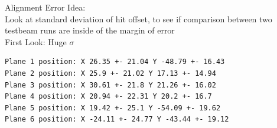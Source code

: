 \documentclass{beamer}
\begin{document}
\begin{frame}[fragile]{Alignment Error}
    \LARGE Idea: \normalsize \\
    Look at standard deviation of hit offset, to see if comparison between two
    testbeam runs are inside of the margin of error \\[.3cm]
    \LARGE First Look: \normalsize Huge \( \sigma \) \\
    \begin{lstlisting}
Plane 1 position: X 26.35 +- 21.04 Y -48.79 +- 16.43
Plane 2 position: X 25.9 +- 21.02 Y 17.13 +- 14.94
Plane 3 position: X 30.61 +- 21.8 Y 21.26 +- 16.02
Plane 4 position: X 20.94 +- 22.31 Y 20.2 +- 16.7
Plane 5 position: X 19.42 +- 25.1 Y -54.09 +- 19.62
Plane 6 position: X -24.11 +- 24.77 Y -43.44 +- 19.12
    \end{lstlisting}
\end{frame}
\end{document}
